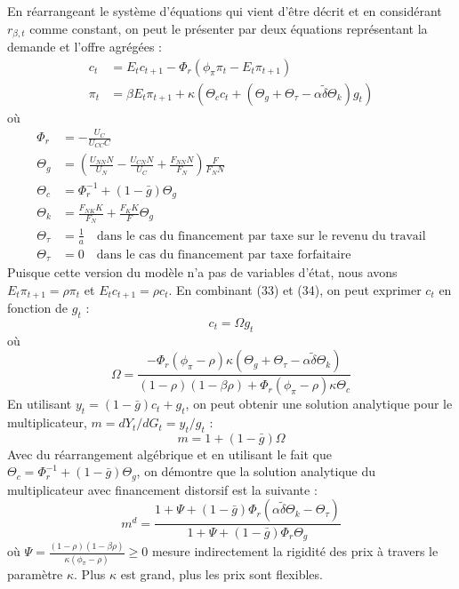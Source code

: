 \documentclass[12pt,letterpaper]{article}
\newcommand{\Et}{E_t}
\newcommand{\gbar}{\bar{g}}
\newcommand{\dtilde}{\tilde{\delta}}
\newcommand{\Theg}{\Theta_g}
\newcommand{\Thec}{\Theta_c}
\newcommand{\Thek}{\Theta_k}
\newcommand{\Thet}{\Theta_\tau}
\newcommand{\Phir}{\Phi_r}
\begin{document}
En réarrangeant le système d’équations qui vient d’être décrit et en considérant $r_{\beta,t}$ comme constant, on peut le présenter par deux équations représentant la demande et l’offre agrégées :
\begin{align}
c_t &= \Et c_{t+1} - \Phir(\phi_\pi\pi_t - \Et\pi_{t+1}) \tag{33}\\
\pi_t &= \beta\Et\pi_{t+1} + \kappa\left(\Thec c_t + (\Theg + \Thet - \alpha\dtilde\Thek)g_t\right) \tag{34}
\end{align}
où
\begin{align}
\Phir &= -\frac{U_C}{U_{CC}C} \tag{35}\\
\Theg &= \left(\frac{U_{NN}N}{U_N} - \frac{U_{CN}N}{U_C} + \frac{F_{NN}N}{F_N}\right)\frac{F}{F_N N} \tag{36}\\
\Thec &= \Phir^{-1} + (1-\gbar)\Theg \tag{37}\\
\Thek &= \frac{F_{NK}K}{F_N} + \frac{F_K K}{F}\Theg \tag{38}\\
\Thet &= \frac{1}{a} \quad \text{dans le cas du financement par taxe sur le revenu du travail} \tag{39}\\
\Thet &= 0 \quad \text{dans le cas du financement par taxe forfaitaire} \tag{40}
\end{align}
Puisque cette version du modèle n’a pas de variables d’état, nous avons $\Et\pi_{t+1} = \rho\pi_t$ et $\Et c_{t+1} = \rho c_t$. En combinant (33) et (34), on peut exprimer $c_t$ en fonction de $g_t$ :
\begin{equation}
c_t = \Omega g_t \tag{41}
\end{equation}
où
\begin{equation}
\Omega = \frac{-\Phir(\phi_\pi-\rho)\kappa\left(\Theg + \Thet - \alpha\dtilde\Thek\right)}{(1-\rho)(1-\beta\rho) + \Phir(\phi_\pi-\rho)\kappa\Thec} \tag{42}
\end{equation}
En utilisant $y_t = (1-\gbar)c_t + g_t$, on peut obtenir une solution analytique pour le multiplicateur, $m = dY_t/dG_t = y_t/g_t$ :
\begin{equation}
m = 1 + (1-\gbar)\Omega \tag{43}
\end{equation}
Avec du réarrangement algébrique et en utilisant le fait que $\Thec = \Phir^{-1} + (1-\gbar)\Theg$, on démontre que la solution analytique du multiplicateur avec financement distorsif est la suivante :
\begin{equation}
m^d = \frac{1 + \Psi + (1-\gbar)\Phir\left(\alpha\dtilde\Thek - \Thet\right)}{1 + \Psi + (1-\gbar)\Phir\Theg} \tag{44}
\end{equation}
où $\Psi = \frac{(1-\rho)(1-\beta\rho)}{\kappa(\phi_\pi-\rho)} \geq 0$ mesure indirectement la rigidité des prix à travers le paramètre $\kappa$. Plus $\kappa$ est grand, plus les prix sont flexibles.
\end{document}
